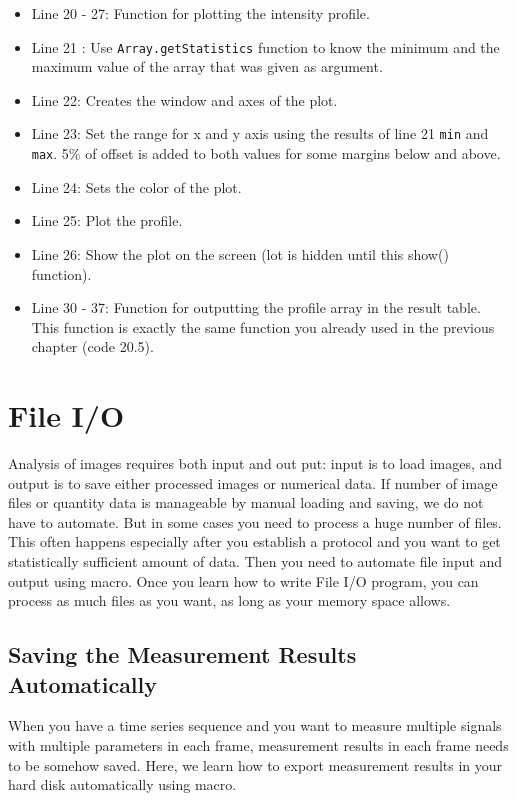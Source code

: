 \documentclass[11pt,a4paper,oneside]{report}
\newcommand{\ilcom}[1]{\texttt{\small#1}}
\begin{document}
\begin{itemize}
\item Line 20 - 27: Function for plotting the intensity profile.
\item Line 21 : Use \ilcom{Array.getStatistics} function to know the minimum and
the maximum value of the array that was given as argument.
\item Line 22: Creates the window and axes of the plot. 
\item Line 23: Set the range for x and y axis using the results of line 21
\ilcom{min} and \ilcom{max}. 5\% of offset is added to both values for some
margins below and above.
\item Line 24: Sets the color of the plot. 
\item Line 25: Plot the profile. 
\item Line 26: Show the plot on the screen (lot is hidden until this show()
function).

\item Line 30 - 37: Function for outputting the profile array in the result
table. This function is exactly the same function you already used in the
previous chapter (code 20.5).

\end{itemize}

\newpage

\section{File I/O}

Analysis of images requires both input and out put: input is to load images, 
and output is  to save either processed images or numerical data. 
If number of image files or quantity data is manageable by manual loading and saving, 
we do not have to automate. But in some cases you need to process a huge number of files. 
This often happens especially after you establish a protocol and you want to get 
statistically sufficient amount of data. Then you need to automate file input and output using macro. 
Once you learn how to write File I/O program, you can process as much files as you want, 
as long as your memory space allows.

\subsection{Saving the Measurement Results Automatically}

When you have a time series sequence and you want to measure multiple signals with 
multiple parameters in each frame, measurement results in each frame needs to be somehow saved. 
Here, we learn how to export measurement results in your hard disk automatically using macro. 
\end{document}
